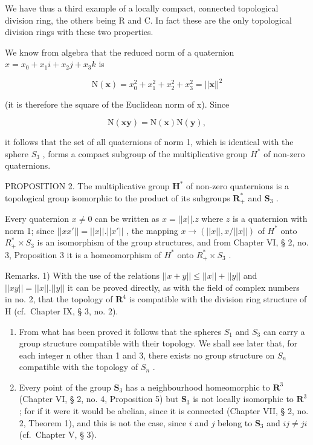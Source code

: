 We have thus a third example of a locally compact, connected topological division ring, the others being R and C. In fact these are the only topological division rings with these two properties.

We know from algebra that the reduced norm of a quaternion \(x = x_{0} + x_{1}i + x_{2}j + x_{3}k\) is

\[
\mathrm{N} (\boldsymbol {x}) = x _ {0} ^ {2} + x _ {1} ^ {2} + x _ {2} ^ {2} + x _ {3} ^ {2} = | | \boldsymbol {x} | | ^ {2}
\]

(it is therefore the square of the Euclidean norm of x). Since

\[
\mathrm{N} (\boldsymbol {x y}) = \mathrm{N} (\boldsymbol {x}) \mathrm{N} (\boldsymbol {y}),
\]

it follows that the set of all quaternions of norm 1, which is identical with the sphere \(S_{3}\) , forms a compact subgroup of the multiplicative group \(H^{*}\) of non-zero quaternions.

PROPOSITION 2. The multiplicative group \(\mathbf{H}^*\) of non-zero quaternions is a topological group isomorphic to the product of its subgroups \(\mathbf{R}_+^*\) and \(\mathbf{S}_3\) .

Every quaternion \(x \neq 0\) can be written as \(x = ||x||.z\) where \(z\) is a quaternion with norm 1; since \(||xx'|| = ||x||.||x'||\) , the mapping \(x \to (||x||, x/||x||)\) of \(H^*\) onto \(R_+^* \times S_3\) is an isomorphism of the group structures, and from Chapter VI, § 2, no. 3, Proposition 3 it is a homeomorphism of \(H^*\) onto \(R_+^* \times S_3\) .

Remarks. 1) With the use of the relations \(||x + y|| \leqslant ||x|| + ||y||\) and \(||xy|| = ||x||.||y||\) it can be proved directly, as with the field of complex numbers in no. 2, that the topology of \(\mathbf{R}^4\) is compatible with the division ring structure of H (cf.~Chapter IX, § 3, no. 2).

\begin{enumerate}
\def\labelenumi{\arabic{enumi})}
\setcounter{enumi}{1}
\item
  From what has been proved it follows that the spheres \(S_{1}\) and \(S_{3}\) can carry a group structure compatible with their topology. We shall see later that, for each integer n other than 1 and 3, there exists no group structure on \(S_{n}\) compatible with the topology of \(S_{n}\) .
\item
  Every point of the group \(\mathbf{S}_3\) has a neighbourhood homeomorphic to \(\mathbf{R}^3\) (Chapter VI, § 2, no. 4, Proposition 5) but \(\mathbf{S}_3\) is not locally isomorphic to \(\mathbf{R}^3\) ; for if it were it would be abelian, since it is connected (Chapter VII, § 2, no. 2, Theorem 1), and this is not the case, since \(i\) and \(j\) belong to \(\mathbf{S}_3\) and \(ij \neq ji\) (cf.~Chapter V, § 3).
\end{enumerate}

